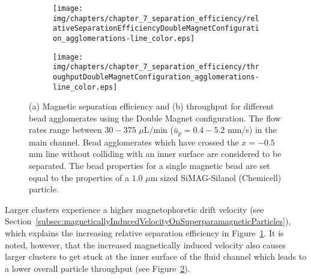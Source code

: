 \begin{figure}[htb]
        \centering
        \begin{subfigure}[b]{0.48\textwidth}
                \texttt{[image: img/chapters/chapter\_7\_separation\_efficiency/relativeSeparationEfficiencyDoubleMagnetConfiguration\_agglomerations-line\_color.eps]}
                \caption{}  
                \label{fig:relativeSeparationEfficiencyDoubleMagnetConfigurationAgglomerations}
        \end{subfigure}
        \hfill
        \begin{subfigure}[b]{0.48\textwidth}
                \texttt{[image: img/chapters/chapter\_7\_separation\_efficiency/throughputDoubleMagnetConfiguration\_agglomerations-line\_color.eps]}
                \caption{}       
                \label{fig:particleThroughputDoubleMagnetConfigurationAgglomerations}         
        \end{subfigure}
        \caption[Relative magnetic separation efficiency and throughput of magnetic bead agglomerates for different flow rates using the Double Magnet configuration]{(a) Magnetic separation efficiency and (b) throughput for different bead agglomerates using the Double Magnet configuration. The flow rates range between $30-375$ $\mu$L/min ($\bar{u}_{p}=0.4-5.2$ mm/s) in the main channel. Bead agglomerates which have crossed the $x=-0.5$ mm line without colliding with an inner surface are considered to be separated. The bead properties for a single magnetic bead are set equal to the properties of a $1.0$ $\mu$m sized SiMAG-Silanol (Chemicell) particle.}
        \label{fig:relativeSeparationEfficiencyAndParticleThroughputDoubleMagnetConfigurationAgglomerations}
\end{figure}

Larger clusters experience a higher magnetophoretic drift velocity (see Section~\ref{subsec:magneticallyInducedVelocityOnSuperparamagneticParticles}), which explains the increasing relative separation efficiency in Figure~\ref{fig:relativeSeparationEfficiencyDoubleMagnetConfigurationAgglomerations}. It is noted, however, that the increased magnetically induced velocity also causes larger clusters to get stuck at the inner surface of the fluid channel which leads to a lower overall particle throughput (see Figure~\ref{fig:particleThroughputDoubleMagnetConfigurationAgglomerations}).

